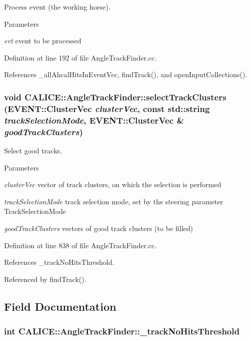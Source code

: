 Process event (the working horse). 
\begin{DoxyParams}{Parameters}
\item[{\em evt}]event to be processed \end{DoxyParams}


Definition at line 192 of file AngleTrackFinder.cc.

References \_\-allAhcalHitsInEventVec, findTrack(), and openInputCollections().
\subsubsection[{selectTrackClusters}]{\setlength{\rightskip}{0pt plus 5cm}void CALICE::AngleTrackFinder::selectTrackClusters (EVENT::ClusterVec {\em clusterVec}, \/  const std::string {\em trackSelectionMode}, \/  EVENT::ClusterVec \& {\em goodTrackClusters})\hspace{0.3cm}{\ttfamily  [private]}}\label{classCALICE_1_1AngleTrackFinder_a48012b9d15a3a0e4e8ea6231bbf93dac}


Select good tracks. 
\begin{DoxyParams}{Parameters}
\item[{\em clusterVec}]vector of track clusters, on which the selection is performed \item[{\em trackSelectionMode}]track selection mode, set by the steering parameter TrackSelectionMode \item[{\em goodTrackClusters}]vectors of good track clusters (to be filled) \end{DoxyParams}


Definition at line 838 of file AngleTrackFinder.cc.

References \_\-trackNoHitsThreshold.

Referenced by findTrack().

\subsection{Field Documentation}
\subsubsection[{\_\-trackNoHitsThreshold}]{\setlength{\rightskip}{0pt plus 5cm}int {\bf CALICE::AngleTrackFinder::\_\-trackNoHitsThreshold}\hspace{0.3cm}{\ttfamily  [private]}}\label{classCALICE_1_1AngleTrackFinder_af196bbbed608a60877075df58d8d7916}


